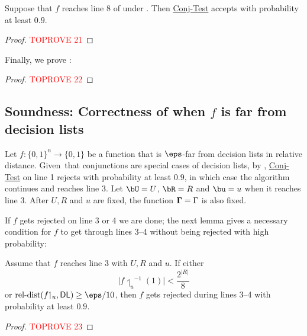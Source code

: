\documentclass[11pt]{article}
\theoremstyle{definition}
\begin{document}
\begin{lemma}\label{lem: f is DL all queries are good.}
    Suppose that $f$ reaches line $8$ of  under . 
     Then  \hyperlink{Algorithm2}{\sc Conj-Test}  accepts with probability at least $0.9$.
\end{lemma}
\begin{proof}\textcolor{red}{TOPROVE 21}\end{proof}





Finally, we prove :
\begin{proof}\textcolor{red}{TOPROVE 22}\end{proof}



\subsection{Soundness: 
 Correctness of  when $f$ is far from decision lists}\label{sec:soundness}

Let $f:\{0,1\}^n\rightarrow \{0,1\}$ be a function that is $\eps$-far from
  decision lists in relative distance.
Given~that conjunctions are special cases of 
  decision lists,
  by , \hyperlink{Algorithm2}{\sc Conj-Test} 
    on line 1 rejects with probability at least $0.9$, in which case the algorithm continues 
    and reaches line 3.
Let $\bU=U$, $\bR=R$ and $\bu=u$ when it reaches line 3. After $U,R$ and $u$
  are fixed, the function  
  $\mathbf{\Gamma}=\Gamma$ is also fixed.



If $f$ gets rejected on line 3 or 4 we are done;
  the next lemma gives a necessary condition
  for $f$ to get through lines 3--4 without 
  being rejected {with high probability}:


\begin{lemma}\label{thm: large premimage fu}
Assume that $f$ reaches line 3 with $U,R$ and $u$. 
If either 
\begin{equation}\label{eq:hehe1}\left|f{\upharpoonleft_{u}}^{-1}(1)\right|<\frac{2^{|R|}}{8}
\end{equation}
or $\reldist(f{\upharpoonleft_{u}},\textsf{DL})\ge \eps/10$, then $f$ gets rejected during lines 3--4 with probability at least $0.9$.
\end{lemma}
\begin{proof}\textcolor{red}{TOPROVE 23}\end{proof}
\end{document}

